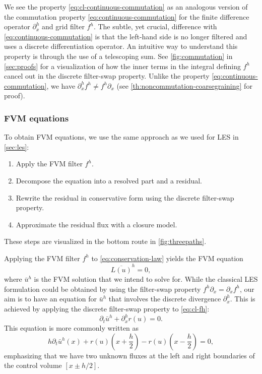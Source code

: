 \documentclass[preprint,twocolumn,5p]{elsarticle}
\begin{document}
We see the property \eqref{eq:cl-continuous-commutation}
as an analogous version of the commutation property \eqref{eq:continuous-commutation}
for the finite difference operator $\partial^h_x$ and grid filter $f^h$.
The subtle, yet crucial, difference with \eqref{eq:continuous-commutation}
is that the left-hand side is no longer filtered and uses a discrete
differentiation operator.
An intuitive way to understand this property is through the use of a telescoping sum.
See \cref{fig:commutation} in \ref{sec:proofs} for a visualization
of how the inner terms in the integral defining $f^h$ cancel out in the
discrete filter-swap property.
Unlike the property \eqref{eq:continuous-commutation},
we have $\partial^h_x f^h \neq f^h \partial_x$
(see \cref{th:noncommutation-coarsegraining} for proof).


\subsubsection{FVM equations}

To obtain FVM equations, we use the same approach as we used for LES
in \cref{sec:les}:
\begin{enumerate}
    \item Apply the FVM filter $f^h$.
    \item Decompose the equation into a resolved part and a residual.
    \item Rewrite the residual in conservative form using the discrete
        filter-swap property.
    \item Approximate the residual flux with a closure model.
\end{enumerate}
These steps are visualized in the bottom route in \cref{fig:threepaths}.

Applying the FVM filter $f^h$ to \cref{eq:conservation-law} yields the FVM
equation
\begin{equation} \label{eq:cl-fh}
    \overline{L(u)}^h = 0,
\end{equation}
where $\bar{u}^h$ is the FVM solution that we intend to solve for.
While the classical LES formulation could be obtained by using the 
filter-swap property $f^h \partial_x = \partial_x f^h$,
our aim is to have an equation for $\bar{u}^h$ that involves the discrete
divergence $\partial^h_x$. This is achieved by applying the
discrete filter-swap property to \cref{eq:cl-fh}:
\begin{equation} \label{eq:cl-finite-volume}
    \partial_t \bar{u}^h + \partial^h_x r(u) = 0.
\end{equation}
This equation is more commonly written as
\begin{equation} \label{eq:cl-finite-volume-integral}
    h \partial_t \bar{u}^h(x) + r(u)\left(x + \frac{h}{2}\right) - r(u)\left(x - \frac{h}{2}\right) = 0,
\end{equation}
emphasizing that we have two unknown fluxes at the left and right
boundaries of the control volume $[x \pm h / 2]$.
\end{document}
